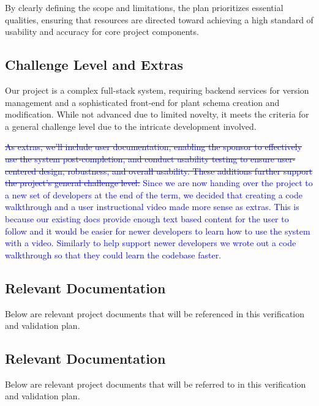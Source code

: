\documentclass[12pt, titlepage]{article}
\begin{document}
By clearly defining the scope and limitations, the plan prioritizes essential qualities, ensuring that resources are directed toward achieving a high standard of usability and accuracy for core project components.
 

\subsection{Challenge Level and Extras}

Our project is a complex full-stack system, requiring backend services for version management and a sophisticated front-end for plant schema creation and modification. While not advanced due to limited novelty, it meets the criteria for a general challenge level due to the intricate development involved.

\textcolor{blue}{\sout{As extras, we’ll include user documentation, enabling the sponsor to effectively use the system post-completion, and conduct usability testing to ensure user-centered design, robustness, and overall usability. These additions further support the project’s general challenge level.}
Since we are now handing over the project to a new set of developers at the end of the term, we decided that creating a code walkthrough and a user instructional video made more sense as extras. This is because our existing docs provide enough text based content for the user to follow and it would be easier for newer developers to learn how to use the system with a video. Similarly to help support newer developers we wrote out a code walkthrough so that they could learn the codebase faster. }


\subsection{Relevant Documentation}

Below are relevant project documents that will be referenced in this verification and validation plan.

\subsection{Relevant Documentation}

Below are relevant project documents that will be referred to in this verification and validation plan.
\end{document}
